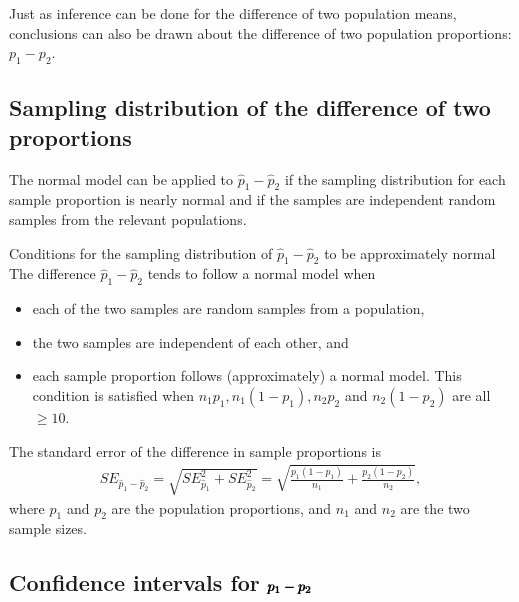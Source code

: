 Just as inference can be done for the difference of two population means, conclusions can also be drawn about the difference of two population proportions: $p_1 - p_2$. 

\subsection{Sampling distribution of the difference of two proportions}


The normal model can be applied to $\hat{p}_1 - \hat{p}_2$ if the sampling distribution for each sample proportion is nearly normal and if the samples are independent random samples from the relevant populations. 

\begin{onebox}{Conditions for the sampling distribution of $\hat{p}_1 - \hat{p}_2$ to be approximately normal}
The difference $\hat{p}_1 - \hat{p}_2$ tends to follow a normal model when
\begin{itemize}
\setlength{\itemsep}{0mm}
\item each of the two samples are random samples from a population,
\item the two samples are independent of each other, and
\item each sample proportion follows (approximately) a normal model. This condition is satisfied when $n_1p_1, n_1(1 - p_1), n_2 p_2$ and $n_2(1 - p_2)$ are all $\geq 10$.
\end{itemize}
The standard error of the difference in sample proportions is
\begin{eqnarray}
SE_{\hat{p}_1 - \hat{p}_2}
	= \sqrt{SE_{\hat{p}_1}^2 + SE_{\hat{p}_2}^2}
	= \sqrt{\frac{p_1(1-p_1)}{n_1} + \frac{p_2(1-p_2)}{n_2}},
\label{seForDiffOfProp}
\end{eqnarray}
where $p_1$ and $p_2$ are the population proportions, and $n_1$ and $n_2$ are the two sample sizes.
\end{onebox}




\subsection{Confidence intervals for $\pmb{\MakeLowercase{p_1 - p_2}}$}
\label{confidenceIntervalsDifferenceProportions}

